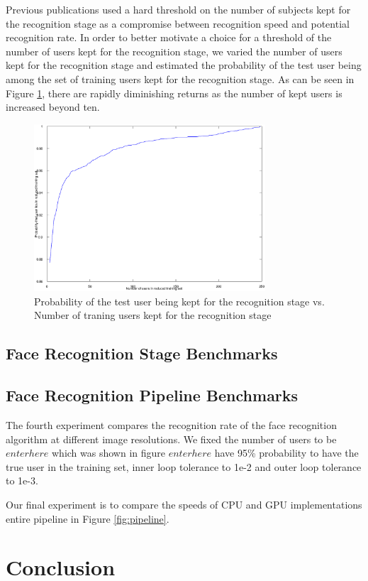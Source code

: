 \documentclass[10pt,twocolumn,letterpaper]{article}
\begin{document}
Previous publications used a hard threshold on the number of subjects kept for the recognition
stage as a compromise between recognition speed and potential recognition rate.
In order to better motivate 
a choice for a threshold of the number of users kept for the recognition stage,
we varied the number of users kept for the recognition stage and estimated the probability
of the test user being among the set of training users kept for the recognition stage.
As can be seen in Figure \ref{fig:user_alignment_rank_plot}, there are rapidly diminishing
returns as the number of kept users is increased beyond ten.  
\begin{figure}
\centering
\includegraphics[width=3.4in]{figures/user_alignment_rank_plot}
\caption{Probability of the test user being kept for the recognition stage vs. Number of traning
users kept for the recognition stage}
\label{fig:user_alignment_rank_plot}
\end{figure}

\subsection{Face Recognition Stage Benchmarks}
\label{sec:recognition_benchmark}

\subsection{Face Recognition Pipeline Benchmarks}
\label{sec:pipeline_benchmark}
The fourth experiment compares the recognition rate of the face recognition algorithm at different
image resolutions.  We fixed the number of users to be $enter here$ which was shown in figure  $enter here$  have 95\% probability
to have the true user in the training set, inner loop tolerance to 1e-2 and outer loop tolerance to 1e-3.  

Our final experiment is to compare the speeds of CPU and GPU implementations entire pipeline in Figure \ref{fig:pipeline}.

\section{Conclusion}

{\small


}
\end{document}
